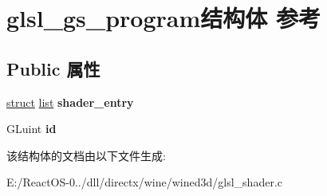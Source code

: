 \hypertarget{structglsl__gs__program}{}\section{glsl\+\_\+gs\+\_\+program结构体 参考}
\label{structglsl__gs__program}
\subsection*{Public 属性}
\begin{DoxyCompactItemize}
\item 
\mbox{\label{structglsl__gs__program_a6f13b0592d9e3a8391b3213a58b5fe2c}} 
\hyperlink{interfacestruct}{struct} \hyperlink{classlist}{list} {\bfseries shader\+\_\+entry}
\item 
\mbox{\label{structglsl__gs__program_aba6282644aa91809806160dadf10537d}} 
G\+Luint {\bfseries id}
\end{DoxyCompactItemize}


该结构体的文档由以下文件生成\+:\begin{DoxyCompactItemize}
\item 
E\+:/\+React\+O\+S-\/0../dll/directx/wine/wined3d/glsl\+\_\+shader.\+c\end{DoxyCompactItemize}
